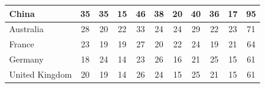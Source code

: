 \documentclass[12pt]{article}  %
\begin{document}
\begin{longtable}{l|c|c|c|c|c|c|c|c|c|c}
	\hline
	China                & 35                                                                     & 35                                                                     & 15                                                                     & 46                                                                     & 38                                                                     & 20                                                                     & 40                        & 36                          & 17                          & 95                         \\ 
	\hline
	Australia            & 28                                                                     & 20                                                                     & 22                                                                     & 33                                                                     & 24                                                                     & 24                                                                     & 29                        & 22                          & 23                          & 71                         \\ 
	\hline
	France               & 23                                                                     & 19                                                                     & 19                                                                     & 27                                                                     & 20                                                                     & 22                                                                     & 24                        & 19                          & 21                          & 64                         \\ 
	\hline
	Germany              & 18                                                                     & 24                                                                     & 14                                                                     & 23                                                                     & 26                                                                     & 16                                                                     & 21                        & 25                          & 15                          & 61                         \\ 
	\hline
	United Kingdom       & 20                                                                     & 19                                                                     & 14                                                                     & 26                                                                     & 24                                                                     & 15                                                                     & 25                        & 21                          & 15                          & 61                         \\ 

\end{longtable}
\end{document}
